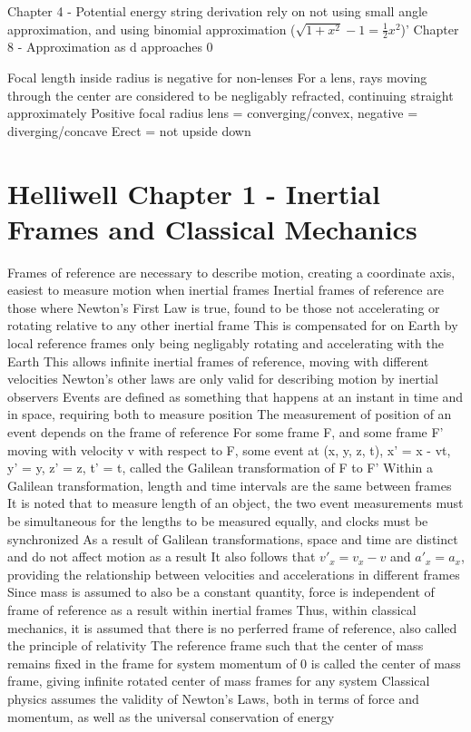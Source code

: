 \documentclass[11 pt, twoside]{article}
\newenvironment{outline*}
{
	\begin{outline}[enumerate]
	}
	{\end{outline}
}
\begin{document}
Chapter 4 - Potential energy string derivation rely on not using small angle approximation, and using binomial approximation ($\sqrt{1 + x^2} - 1 = \frac{1}{2}x^2$)'
Chapter 8 - Approximation as d approaches 0

Focal length inside radius is negative for non-lenses
For a lens, rays moving through the center are considered to be negligably refracted, continuing straight approximately
Positive focal radius lens = converging/convex, negative = diverging/concave
Erect = not upside down
\section{Helliwell Chapter 1 - Inertial Frames and Classical Mechanics}
\begin{outline*}
\1 Frames of reference are necessary to describe motion, creating a coordinate axis, easiest to measure motion when inertial frames
\2 Inertial frames of reference are those where Newton's First Law is true, found to be those not accelerating or rotating relative to any other inertial frame
\3 This is compensated for on Earth by local reference frames only being negligably rotating and accelerating with the Earth
\2 This allows infinite inertial frames of reference, moving with different velocities
\2 Newton's other laws are only valid for describing motion by inertial observers
\1 Events are defined as something that happens at an instant in time and in space, requiring both to measure position
\2 The measurement of position of an event depends on the frame of reference
\2 For some frame F, and some frame F' moving with velocity v with respect to F, some event at (x, y, z, t), x' = x - vt, y' = y, z' = z, t' = t, called the Galilean transformation of F to F'
\3 Within a Galilean transformation, length and time intervals are the same between frames
\3 It is noted that to measure length of an object, the two event measurements must be simultaneous for the lengths to be measured equally, and clocks must be synchronized
\2 As a result of Galilean transformations, space and time are distinct and do not affect motion as a result
\2 It also follows that $v'_x = v_x - v$ and $a'_x = a_x$, providing the relationship between velocities and accelerations in different frames
\3 Since mass is assumed to also be a constant quantity, force is independent of frame of reference as a result within inertial frames
\2 Thus, within classical mechanics, it is assumed that there is no perferred frame of reference, also called the principle of relativity
\1 The reference frame such that the center of mass remains fixed in the frame for system momentum of 0 is called the center of mass frame, giving infinite rotated center of mass frames for any system
\1 Classical physics assumes the validity of Newton's Laws, both in terms of force and momentum, as well as the universal conservation of energy
\end{outline*}
\end{document}
